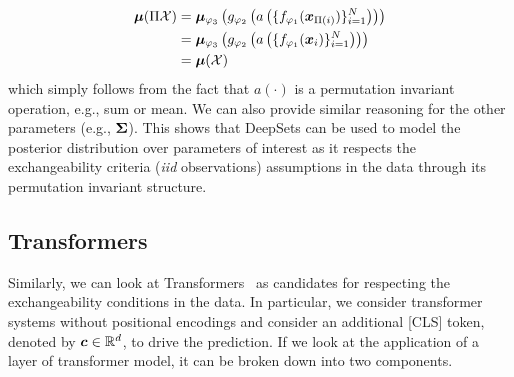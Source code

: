 \begin{align}
    {\bm{\mu}}(\Pi {\mathcal{X}}) &= {\bm{\mu}}_{\varphi_3}\left(g_{\varphi_2}\left(a\left(\{f_{\varphi_1}({\bm{x}}_{\Pi(i)})\}_{i=1}^N\right)\right)\right) \\
    &= {\bm{\mu}}_{\varphi_3}\left(g_{\varphi_2}\left(a\left(\{f_{\varphi_1}({\bm{x}}_i)\}_{i=1}^N\right)\right)\right) \\
    &= {\bm{\mu}}({\mathcal{X}})
\end{align}
which simply follows from the fact that $a(\cdot)$ is a permutation invariant operation, e.g., sum or mean. We can also provide similar reasoning for the other parameters (e.g., ${\bm{\Sigma}}$). This shows that DeepSets can be used to model the posterior distribution over parameters of interest as it respects the exchangeability criteria (\textit{iid} observations) assumptions in the data through its permutation invariant structure.

% 
\subsection{Transformers}
Similarly, we can look at Transformers~\citep{vaswani2017attention} as candidates for respecting the exchangeability conditions in the data. In particular, we consider transformer systems without positional encodings and consider an additional [CLS] token, denoted by ${\bm{c}}\in\mathbb{R}^d$, to drive the prediction. If we look at the application of a layer of transformer model, it can be broken down into two components.


